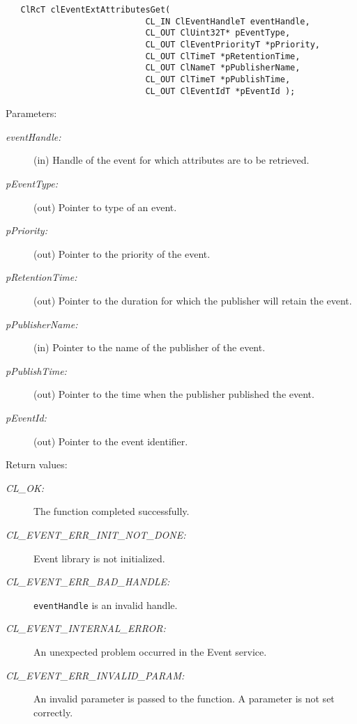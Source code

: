 \begin{flushleft}
\begin{Desc}
\footnotesize\begin{verbatim}   ClRcT clEventExtAttributesGet(
              				CL_IN ClEventHandleT eventHandle,
              				CL_OUT ClUint32T* pEventType,
              				CL_OUT ClEventPriorityT *pPriority,
              				CL_OUT ClTimeT *pRetentionTime,
              				CL_OUT ClNameT *pPublisherName,
              				CL_OUT ClTimeT *pPublishTime,
              				CL_OUT ClEventIdT *pEventId );
\end{verbatim}
\normalsize
\end{Desc}
\begin{Desc}
\item[Parameters:]
\begin{description}
\item[{\em event\-Handle:}](in) Handle of the event for which attributes are to be retrieved. 
\item[{\em p\-Event\-Type:}](out) Pointer to type of an event.
\item[{\em p\-Priority:}](out) Pointer to the priority of the event. 
\item[{\em p\-Retention\-Time:}](out) Pointer to the duration for which the publisher will retain the event. 
\item[{\em p\-Publisher\-Name:}](in) Pointer to the name of the publisher of the event.
\item[{\em p\-Publish\-Time:}](out) Pointer to the time when the publisher published the event. 
\item[{\em p\-Event\-Id:}](out) Pointer to the event 
identifier.\end{description}
\end{Desc}

\begin{Desc}
\item[Return values:]
\begin{description}
\item[{\em CL\_\-OK:}]The function completed successfully. 
\item[{\em CL\_\-EVENT\_\-ERR\_\-INIT\_\-NOT\_\-DONE:}]Event library is not initialized. 
\item[{\em CL\_\-EVENT\_\-ERR\_\-BAD\_\-HANDLE:}]{\tt{eventHandle}} is an invalid handle. 
\item[{\em CL\_\-EVENT\_\-INTERNAL\_\-ERROR:}]An unexpected problem occurred in the Event service. 
\item[{\em CL\_\-EVENT\_\-ERR\_\-INVALID\_\-PARAM:}]An invalid parameter is passed to the function. A parameter is not set correctly.
\end{description}
\end{Desc}


\end{flushleft}
